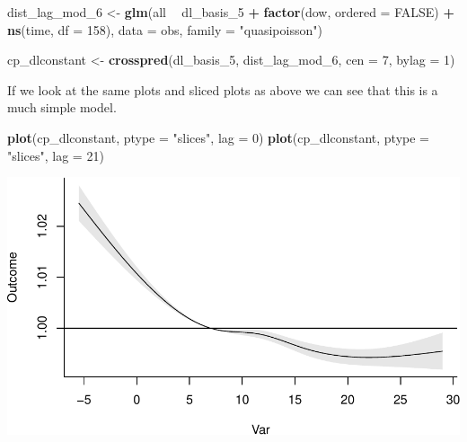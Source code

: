 \documentclass[
]{book}
\newenvironment{Shaded}{\begin{snugshade}}{\end{snugshade}}
\newcommand{\DataTypeTok}[1]{\textcolor[rgb]{0.13,0.29,0.53}{#1}}
\newcommand{\DecValTok}[1]{\textcolor[rgb]{0.00,0.00,0.81}{#1}}
\newcommand{\KeywordTok}[1]{\textcolor[rgb]{0.13,0.29,0.53}{\textbf{#1}}}
\newcommand{\NormalTok}[1]{#1}
\newcommand{\OperatorTok}[1]{\textcolor[rgb]{0.81,0.36,0.00}{\textbf{#1}}}
\newcommand{\OtherTok}[1]{\textcolor[rgb]{0.56,0.35,0.01}{#1}}
\newcommand{\StringTok}[1]{\textcolor[rgb]{0.31,0.60,0.02}{#1}}
\begin{document}
\begin{Shaded}
\begin{Highlighting}[]
\NormalTok{dist_lag_mod_}\DecValTok{6}\NormalTok{ <-}\StringTok{ }\KeywordTok{glm}\NormalTok{(all }\OperatorTok{~}\StringTok{ }\NormalTok{dl_basis_}\DecValTok{5} \OperatorTok{+}\StringTok{ }
\StringTok{                        }\KeywordTok{factor}\NormalTok{(dow, }\DataTypeTok{ordered =} \OtherTok{FALSE}\NormalTok{) }\OperatorTok{+}
\StringTok{                          }\KeywordTok{ns}\NormalTok{(time, }\DataTypeTok{df =} \DecValTok{158}\NormalTok{), }
                        \DataTypeTok{data =}\NormalTok{ obs, }\DataTypeTok{family =} \StringTok{"quasipoisson"}\NormalTok{)}

\NormalTok{cp_dlconstant <-}\StringTok{ }\KeywordTok{crosspred}\NormalTok{(dl_basis_}\DecValTok{5}\NormalTok{, dist_lag_mod_}\DecValTok{6}\NormalTok{, }\DataTypeTok{cen =} \DecValTok{7}\NormalTok{, }\DataTypeTok{bylag =} \DecValTok{1}\NormalTok{)}
\end{Highlighting}
\end{Shaded}

If we look at the same plots and sliced plots as above we can see that this is a much simple model.

\begin{Shaded}
\begin{Highlighting}[]
\KeywordTok{plot}\NormalTok{(cp_dlconstant, }\DataTypeTok{ptype =} \StringTok{"slices"}\NormalTok{, }\DataTypeTok{lag =} \DecValTok{0}\NormalTok{)}
\KeywordTok{plot}\NormalTok{(cp_dlconstant, }\DataTypeTok{ptype =} \StringTok{"slices"}\NormalTok{, }\DataTypeTok{lag =} \DecValTok{21}\NormalTok{)}
\end{Highlighting}
\end{Shaded}

\includegraphics{adv_epi_analysis_files/figure-latex/unnamed-chunk-111-1.pdf}
\end{document}

